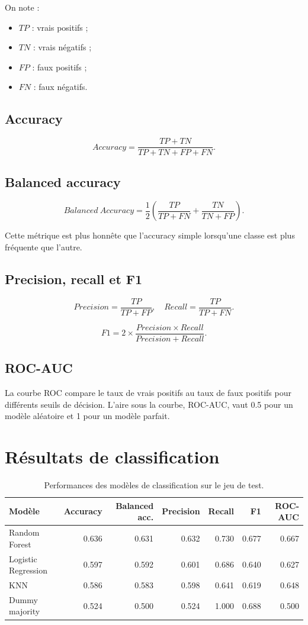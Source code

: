 \documentclass[11pt,a4paper]{article}
\begin{document}
On note :
\begin{itemize}
    \item $TP$ : vrais positifs ;
    \item $TN$ : vrais négatifs ;
    \item $FP$ : faux positifs ;
    \item $FN$ : faux négatifs.
\end{itemize}

\subsection{Accuracy}

\[
Accuracy =
\frac{TP + TN}{TP + TN + FP + FN}.
\]

\subsection{Balanced accuracy}

\[
Balanced\ Accuracy
=
\frac{1}{2}
\left(
\frac{TP}{TP+FN}
+
\frac{TN}{TN+FP}
\right).
\]

Cette métrique est plus honnête que l'accuracy simple lorsqu'une classe est plus fréquente que l'autre.

\subsection{Precision, recall et F1}

\[
Precision =
\frac{TP}{TP+FP},
\quad
Recall =
\frac{TP}{TP+FN}.
\]

\[
F1 =
2 \times
\frac{Precision \times Recall}{Precision + Recall}.
\]

\subsection{ROC-AUC}

La courbe ROC compare le taux de vrais positifs au taux de faux positifs pour différents seuils de décision. L'aire sous la courbe, ROC-AUC, vaut 0.5 pour un modèle aléatoire et 1 pour un modèle parfait.

\section{Résultats de classification}

\begin{table}[H]
\centering
\small
\caption{Performances des modèles de classification sur le jeu de test.}
\begin{tabular}{lrrrrrr}
\toprule
Modèle & Accuracy & Balanced acc. & Precision & Recall & F1 & ROC-AUC \\
\midrule
Random Forest & 0.636 & 0.631 & 0.632 & 0.730 & 0.677 & 0.667 \\
Logistic Regression & 0.597 & 0.592 & 0.601 & 0.686 & 0.640 & 0.627 \\
KNN & 0.586 & 0.583 & 0.598 & 0.641 & 0.619 & 0.648 \\
Dummy majority & 0.524 & 0.500 & 0.524 & 1.000 & 0.688 & 0.500 \\
\bottomrule
\end{tabular}
\end{table}
\end{document}
